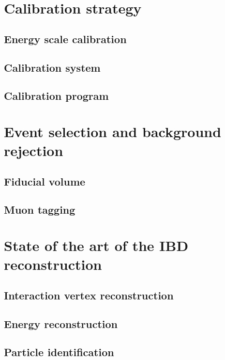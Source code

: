 \section{Calibration strategy}

\subsection{Energy scale calibration}

\subsection{Calibration system}

\subsection{Calibration program}

\section{Event selection and background rejection}


\subsection{Fiducial volume}

\subsection{Muon tagging}

\section{State of the art of the IBD reconstruction}

\subsection{Interaction vertex reconstruction}

\subsection{Energy reconstruction}

\subsection{Particle identification}

